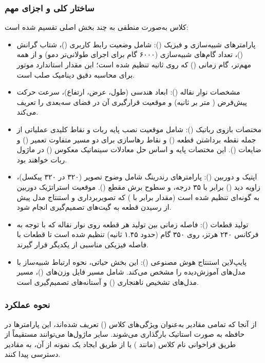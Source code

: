 \documentclass{article}
\begin{document}
\subsubsection{ساختار کلی و اجزای مهم}
کلاس  به‌صورت منطقی به چند بخش اصلی تقسیم شده است:

\begin{itemize}
	\item پارامترهای شبیه‌سازی و فیزیک (): شامل وضعیت رابط کاربری ()، شتاب گرانش ()، تعداد گام‌های شبیه‌سازی (۶۰۰۰ گام برای اجرای طولانی‌تر دمو) و از همه مهم‌تر، گام زمانی () که روی  ثانیه تنظیم شده است؛ این مقدار استاندارد موتور  برای محاسبه دقیق دینامیک صلب است.
	
	\item مشخصات نوار نقاله (): ابعاد هندسی (طول، عرض، ارتفاع)، سرعت حرکت پیش‌فرض ( متر بر ثانیه) و موقعیت قرارگیری آن در فضای سه‌بعدی را تعریف می‌کند.
	
	\item مختصات بازوی رباتیک (): شامل موقعیت نصب پایه ربات و نقاط کلیدی عملیاتی از جمله نقطه برداشتن قطعه () و نقاط رهاسازی برای دو مسیر متفاوت تعمیر () و ضایعات (). این مختصات پایه و اساس حل معادلات سینماتیک معکوس () در ماژول ربات خواهند بود.
	
	\item اپتیک و دوربین (): پارامترهای رندرینگ شامل وضوح تصویر (۳۲۰ در ۳۲۰ پیکسل)، زاویه دید () برابر با ۳۵ درجه، و سطوح برش مقطع (). موقعیت استراتژیک دوربین به گونه‌ای تنظیم شده است (مقدار  برابر با ) که تصویربرداری و استنتاج مدل پیش از رسیدن قطعه به گیت‌های تصمیم‌گیری انجام شود.
	
	\item تولید قطعات (): فاصله زمانی بین تولید هر قطعه روی نوار نقاله که با توجه به فرکانس ۲۴۰ هرتز، روی ۳۵۰ گام (حدود ۱.۴۵ ثانیه) تنظیم شده است تا قطعات با فاصله فیزیکی مناسبی از یکدیگر قرار گیرند.
	
	\item پایپ‌لاین استنتاج هوش مصنوعی (): این بخش حیاتی، نحوه ارتباط شبیه‌ساز با مدل‌های آموزش‌دیده را مشخص می‌کند. شامل مسیر فایل وزن‌های  ()، مسیر مدل‌های تشخیص ناهنجاری () و آستانه‌های تصمیم‌گیری است.
\end{itemize}

\subsubsection{نحوه عملکرد}
از آنجا که تمامی مقادیر به‌عنوان ویژگی‌های کلاس () تعریف شده‌اند، این پارامترها در حافظه به صورت استاتیک بارگذاری می‌شوند. سایر ماژول‌ها می‌توانند مستقیماً از طریق فراخوانی نام کلاس (مانند ) یا از طریق ایجاد یک نمونه از آن، به مقادیر دسترسی پیدا کنند.
\end{document}
